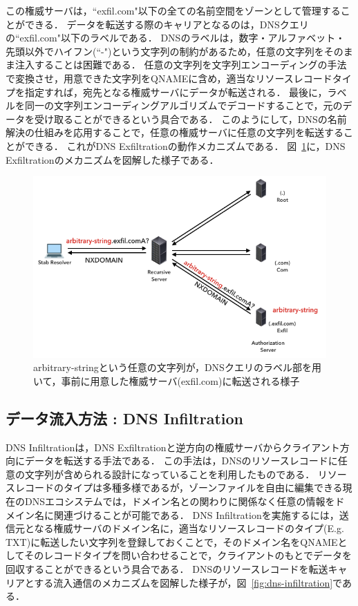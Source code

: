 この権威サーバは，``exfil.com"以下の全ての名前空間をゾーンとして管理することができる．
データを転送する際のキャリアとなるのは，DNSクエリの``exfil.com"以下のラベルである．
DNSのラベルは，数字・アルファベット・先頭以外でハイフン(``-")という文字列の制約があるため，任意の文字列をそのまま注入することは困難である．
任意の文字列を文字列エンコーディングの手法で変換させ，用意できた文字列をQNAMEに含め，適当なリソースレコードタイプを指定すれば，宛先となる権威サーバにデータが転送される．
最後に，ラベルを同一の文字列エンコーディングアルゴリズムでデコードすることで，元のデータを受け取ることができるという具合である．
このようにして，DNSの名前解決の仕組みを応用することで，任意の権威サーバに任意の文字列を転送することができる．
これがDNS Exfiltrationの動作メカニズムである．
図~\ref{fig:dns-exfiltration}に，DNS Exfiltrationのメカニズムを図解した様子である．

\begin{figure}[h]
 \centering
 \includegraphics[width=12.0cm]{figure/dns-exfiltration.png}
 \caption{arbitrary-stringという任意の文字列が，DNSクエリのラベル部を用いて，事前に用意した権威サーバ(exfil.com)に転送される様子}
 \label{fig:dns-exfiltration}
\end{figure}


\subsection{データ流入方法 : DNS Infiltration}
\label{sec:dns-infiltration}
DNS Infiltrationは，DNS Exfiltrationと逆方向の権威サーバからクライアント方向にデータを転送する手法である．
この手法は，DNSのリソースレコードに任意の文字列が含められる設計になっていることを利用したものである．
リソースレコードのタイプは多種多様であるが，ゾーンファイルを自由に編集できる現在のDNSエコシステムでは，ドメイン名との関わりに関係なく任意の情報をドメイン名に関連づけることが可能である．
DNS Infiltrationを実施するには，送信元となる権威サーバのドメイン名に，適当なリソースレコードのタイプ(E.g. TXT)に転送したい文字列を登録しておくことで，そのドメイン名をQNAMEとしてそのレコードタイプを問い合わせることで，クライアントのもとでデータを回収することができるという具合である．
DNSのリソースレコードを転送キャリアとする流入通信のメカニズムを図解した様子が，図~\ref{fig:dns-infiltration}である．


